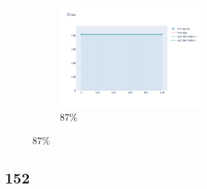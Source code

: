\documentclass[12pt, fleqn]{report}                             %
\theoremstyle{break}                                            %
\begin{document}
\begin{figure}[ht!]
\begin{subfigure}[b]{0.4\linewidth}
          \includegraphics[width=0.6\textwidth]{Images/142/dia-d.png}
          \caption{87\%}
        \end{subfigure}
      \end{figure}


      \clearpage
      \subsection{152}
\end{document}
